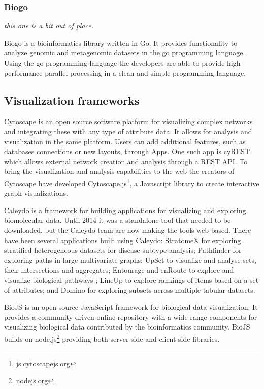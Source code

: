 
\subsubsection*{Biogo} 
\emph{this one is a bit out of place.}

Biogo is a bioinformatics library written in Go. It provides functionality to
analyze genomic and metagenomic datasets in the go programming
language.\cite{Kortschak005033} Using the go programming language the developers
are able to provide high-performance parallel processing in a clean and simple
programming language. 

\subsection*{Visualization frameworks} 
Cytoscape is an open source software platform for visualizing complex
networks and integrating these with any type of attribute
data\cite{shannon2003cytoscape}. It allows for analysis and visualization in the
same platform. Users can add additional features, such as databases connections
or new layouts, through Apps. One such app is cyREST which allows external network
creation and analysis through a REST API\cite{ono2015cyrest}.
To bring the visualization and analysis
capabilities to the web the creators of Cytoscape have developed
Cytoscape.js\footnote{\url{js.cytoscapejs.org}}, a Javascript library to create
interactive graph visualizations. 


Caleydo is a framework for building applications for visualizing and exploring
biomolecular data\cite{cleydo}. Until 2014 it was a standalone tool that needed
to be downloaded, but the Caleydo team are now making the tools web-based. There
have been several applications built using Caleydo: StratomeX for exploring
stratified heterogeneous datasets for disease subtype analysis\cite{stratomex};
Pathfinder for exploring paths in large multivariate graphs\cite{pathfinder};
UpSet to visualize and analyse sets, their intersections and
aggregates\cite{upset}; Entourage and enRoute to explore and visualize
biological pathways \cite{entourage}\cite{enroute}; LineUp to explore rankings
of items based on a set of attributes\cite{lineup}; and Domino for exploring
subsets across multiple tabular datasets\cite{domino}. 

BioJS is an open-source JavaScript framework for biological data
visualization.\cite{gomez2013biojs} It provides a community-driven online
repository with a wide range components for visualizing biological data
contributed by the bioinformatics community. BioJS builds on
node.js\footnote{\url{nodejs.org}} providing both server-side and client-side
libraries. 


